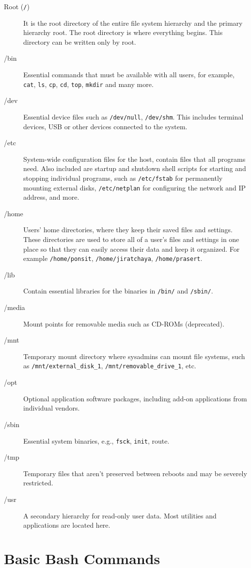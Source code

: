 \documentclass[
  letterpaper,
  DIV=11,
  numbers=noendperiod]{scrreprt}
\begin{document}
\begin{description}
\item[Root (\texttt{/})]
It is the root directory of the entire file system hierarchy and the
primary hierarchy root. The root directory is where everything begins.
This directory can be written only by root.
\item[/bin]
Essential commands that must be available with all users, for example,
\texttt{cat}, \texttt{ls}, \texttt{cp}, \texttt{cd}, \texttt{top},
\texttt{mkdir} and many more.
\item[/dev]
Essential device files such as \texttt{/dev/null}, \texttt{/dev/shm}.
This includes terminal devices, USB or other devices connected to the
system.
\item[/etc]
System-wide configuration files for the host, contain files that all
programs need. Also included are startup and shutdown shell scripts for
starting and stopping individual programs, such as \texttt{/etc/fstab}
for permanently mounting external disks, \texttt{/etc/netplan} for
configuring the network and IP address, and more.
\item[/home]
Users' home directories, where they keep their saved files and settings.
These directories are used to store all of a user's files and settings
in one place so that they can easily access their data and keep it
organized. For example \texttt{/home/ponsit}, \texttt{/home/jiratchaya},
\texttt{/home/prasert}.
\item[/lib]
Contain essential libraries for the binaries in \texttt{/bin/} and
\texttt{/sbin/}.
\item[/media]
Mount points for removable media such as CD-ROMs (deprecated).
\item[/mnt]
Temporary mount directory where sysadmins can mount file systems, such
as \texttt{/mnt/external\_disk\_1}, \texttt{/mnt/removable\_drive\_1},
etc.
\item[/opt]
Optional application software packages, including add-on applications
from individual vendors.
\item[/sbin]
Essential system binaries, e.g., \texttt{fsck}, \texttt{init}, route.
\item[/tmp]
Temporary files that aren't preserved between reboots and may be
severely restricted.
\item[/usr]
A secondary hierarchy for read-only user data. Most utilities and
applications are located here.
\end{description}

\hypertarget{basic-bash-commands}{%
\section{Basic Bash Commands}\label{basic-bash-commands}}
\end{document}
